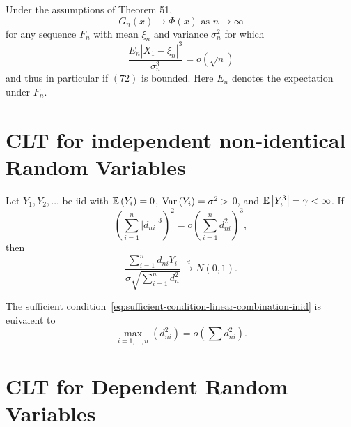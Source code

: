 \begin{corollary}
	Under the assumptions of Theorem 51,
	\begin{equation*}
		G_{n}(x) \rightarrow \Phi(x) \text { as } n \rightarrow \infty
	\end{equation*}
	for any sequence \(F_{n}\) with mean \(\xi_{n}\) and variance \(\sigma_{n}^{2}\) for which
	\begin{equation*}
		\frac{E_{n}\left|X_{1}-\xi_{n}\right|^{3}}{\sigma_{n}^{3}}=o(\sqrt{n})
	\end{equation*}
	and thus in particular if \((72)\) is bounded. Here \(E_{n}\) denotes the expectation under \(F_{n}\).
\end{corollary}

\section{CLT for independent non-identical Random Variables}

\begin{theorem}\label{thm:liapounov-clt}

\end{theorem}

\begin{theorem}\label{thm:linear-combination-inid}
	Let \(Y_1,Y_2,\ldots\) be iid with \(\mathbb{E}\left(Y_{i}\right)=0\), \(\mathrm{Var}\left(Y_{i}\right)=\sigma^2>\) 0, and \(\mathbb{E}\left|Y_{i}^3\right|=\gamma<\infty\). If
	\begin{equation}
		\label{eq:sufficient-condition-linear-combination-inid}
		\left(\sum_{i=1}^n\left|d_{ni}\right|^3\right)^2=o\left(\sum_{i=1}^{n}d_{ni}^2\right)^3,
	\end{equation}
	then
	\begin{equation*}
		\frac{\sum_{i=1}^{n}d_{ni}Y_{i}}{\sigma\sqrt{\sum_{i=1}^{n}d_{n }^2}}\stackrel{d}{\rightarrow}N(0,1).
	\end{equation*}
\end{theorem}

\begin{corollary}
	The sufficient condition~\eqref{eq:sufficient-condition-linear-combination-inid} is euivalent to
	\begin{equation}
		\max_{i=1,\ldots,n}\left(d_{ni}^2\right)=o\left(\sum d_{ni}^2\right).
	\end{equation}
\end{corollary}

\section{CLT for Dependent Random Variables}
